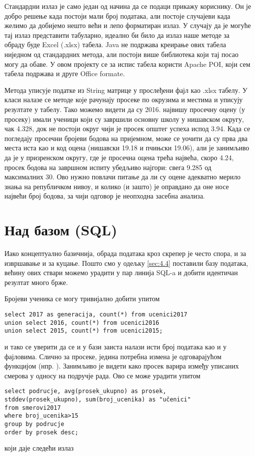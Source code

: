 Стандардни излаз је само један од начина да се подаци прикажу кориснику. Он је добро решење када постоји мали број података, али постоје случајеви када желимо да добијемо нешто већи и лепо форматиран излаз. У случају да је могуће тај излаз представити табуларно, идеално би било да излаз наше методе за обраду буде Excel (.xlsx) табела. Java не подржава креирање ових табела ниједном од стандардних метода, али постоји више библиотека који тај посао могу да обаве. У овом пројекту се за испис табела користи Apache POI, који сем табела подржава и друге Office formate.

Метода  уписује податке из String матрице у прослеђени фајл као .xlsx табелу. У класи  налазе се методе које рачунају просеке по окрузима и местима и уписују резултате у табелу. Тако можемо видети да су 2016. највишу просечну оцену (у просеку) имали ученици који су завршили основну школу у нишавском округу, чак 4.328, док не постоји округ чији је просек општег успеха испод 3.94. Када се погледају просечни бројеви бодова на пријемном, може се уочити да су прва два места иста као и код оцена (нишавски 19.18 и пчињски 19.06), али је занимљиво да је у призренском округу, где је просечна оцена трећа највећа, скоро 4.24, просек бодова на завршном испиту убедљиво најгори: свега 9.285 од максималних 30. Ово нужно повлачи питање да ли су оцене адекватно мерило знања на републичком нивоу, и колико (и зашто) је оправдано да оне носе највећи број бодова, за чији одговор је неопходна засебна анализа.

\section{Над базом (SQL)}\label{ch:obradasql}

Иако концептуално базичнија, обрада података кроз скрепер је често спора, и за извршавање и за куцање. Пошто смо у одељку \ref{sec:4.4} поставили базу података, већину ових ствари можемо урадити у пар линија SQL-a и добити идентичан резултат много брже.

Бројеви ученика се могу тривијално добити упитом 
\begin{verbatim}
select 2017 as generacija, count(*) from ucenici2017 
union select 2016, count(*) from ucenici2016 
union select 2015, count(*) from ucenici2015;
\end{verbatim} 
и тако се уверити да се и у бази заиста налази исти број података као и у фајловима. Слично за просеке, једина потребна измена је  одговарајућом функцијом (нпр. ). Занимљиво је видети како просек варира између уписаних смерова у односу на подручје рада. Ово се може урадити упитом
\begin{verbatim}
select podrucje, avg(prosek_ukupno) as prosek, 
stddev(prosek_ukupno), sum(broj_ucenika) as "učenici"
from smerovi2017 
where broj_ucenika>15 
group by podrucje 
order by prosek desc;
\end{verbatim}
који даје следећи излаз

